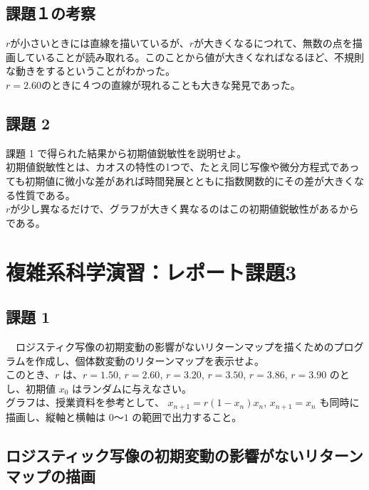 \documentclass[dvipdfmx,uplatex]{jsarticle}
\begin{document}
\subsection{課題１の考察}
$r$が小さいときには直線を描いているが、$r$が大きくなるにつれて、無数の点を描画していることが読み取れる。このことから値が大きくなればなるほど、不規則な動きをするということがわかった。\\
$r = 2.60$のときに４つの直線が現れることも大きな発見であった。\\

\subsection{課題 2}
  課題 1 で得られた結果から初期値鋭敏性を説明せよ。\\


初期値鋭敏性とは、カオスの特性の1つで、たとえ同じ写像や微分方程式であっても初期値に微小な差があれば時間発展とともに指数関数的にその差が大きくなる性質である。\\
$r$が少し異なるだけで、グラフが大きく異なるのはこの初期値鋭敏性があるからである。\\

\newpage

\section{複雑系科学演習：レポート課題3}

\subsection{課題 1}
　ロジスティク写像の初期変動の影響がないリターンマップを描くためのプログラムを作成し、個体数変動のリターンマップを表示せよ。\\
このとき、$r$ は、$r = 1.50$, $r = 2.60$, $r = 3.20$, $r = 3.50$, $r = 3.86$, $r = 3.90$ のとし、初期値 $x_{0}$ はランダムに与えなさい。\\
グラフは、授業資料を参考として、 $x_{n+1} = r(1 − x_{n})x_{n}$, $x_{n+1} = x_{n}$ も同時に描画し、縦軸と横軸は $0$～$1$ の範囲で出力すること。\\

\newpage

\subsection{ロジスティック写像の初期変動の影響がないリターンマップの描画}
\end{document}
